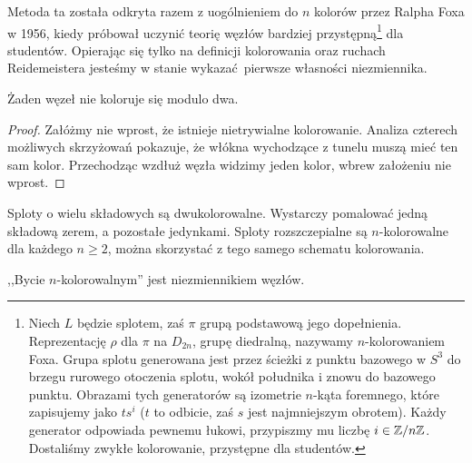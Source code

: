 Metoda ta została odkryta razem z uogólnieniem do $n$ kolorów przez Ralpha Foxa w 1956, kiedy próbował uczynić teorię węzłów bardziej przystępną\footnote{
	Niech $L$ będzie splotem, zaś $\pi$ grupą podstawową jego dopełnienia.
	Reprezentację $\rho$ dla $\pi$ na $D_{2n}$, grupę diedralną, nazywamy $n$-kolorowaniem Foxa.
	Grupa splotu generowana jest przez ścieżki z punktu bazowego w $S^3$ do brzegu rurowego otoczenia splotu, wokół południka i znowu do bazowego punktu.
	Obrazami tych generatorów są izometrie $n$-kąta foremnego, które zapisujemy jako $ts^i$ ($t$ to odbicie, zaś $s$ jest najmniejszym obrotem).
	Każdy generator odpowiada pewnemu łukowi, przypiszmy mu liczbę $i \in \mathbb Z/n\mathbb Z$.
	Dostaliśmy zwykłe kolorowanie, przystępne dla studentów.
}
dla studentów.
Opierając się tylko na definicji kolorowania oraz ruchach Reidemeistera jesteśmy w stanie wykazać pierwsze własności niezmiennika.

\begin{proposition}
	Żaden węzeł nie koloruje się modulo dwa.
\end{proposition}

\begin{proof}
	Załóżmy nie wprost, że istnieje nietrywialne kolorowanie.
	Analiza czterech możliwych skrzyżowań pokazuje,
	że włókna wychodzące z tunelu muszą mieć ten sam kolor.
	Przechodząc wzdłuż węzła widzimy jeden kolor, wbrew założeniu nie wprost.
\end{proof}

Sploty o wielu składowych są dwukolorowalne.
Wystarczy pomalować jedną składową zerem, a pozostałe jedynkami.
Sploty rozszczepialne są $n$-kolorowalne dla każdego $n \ge 2$, można skorzystać z tego samego schematu kolorowania.

\begin{proposition} \label{color_invariant}
	,,Bycie $n$-kolorowalnym'' jest niezmiennikiem węzłów.
\end{proposition}

